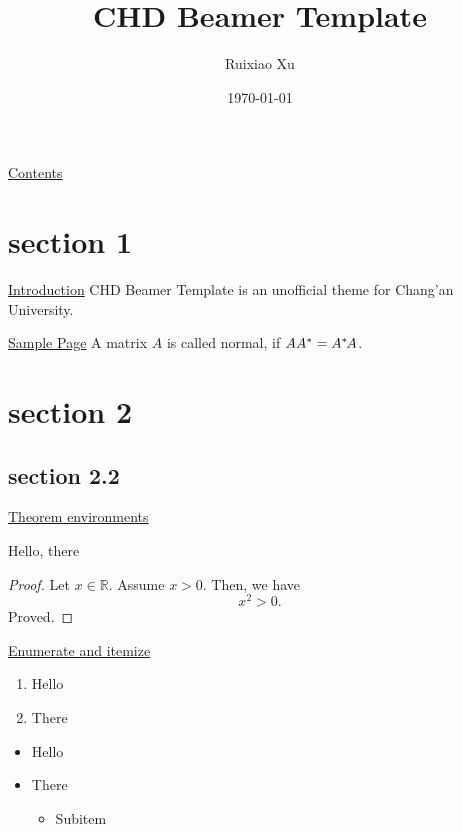 \documentclass[11pt,aspectratio=43,xcolor={dvipsnames},hyperref={pdftex,pdfpagemode=UseNone,hidelinks,pdfdisplaydoctitle=true},usepdftitle=false]{ctexbeamer}
\title{CHD Beamer Template}
\author{Ruixiao Xu}
\institute{School of Information Engineering\\Chang'an University}
\date{\today}
\begin{document}
\begin{frame}
  \maketitle
\end{frame}

\begin{frame}{\underline{Contents}}
  \tableofcontents
\end{frame}

\section{section 1}
\begin{frame}{\underline{Introduction}}
  \alert{CHD Beamer Template} is an unofficial theme for Chang'an University.
\end{frame}

\begin{frame}{\underline{Sample Page}}
  A matrix $A$ is called normal, if $AA^*=A^*\mskip-2muA$.
\end{frame}

\section{section 2}
\subsection{section 2.2}
\begin{frame}{\underline{Theorem environments}}
  \begin{theorem}
    Hello, there
  \end{theorem}
  \begin{proof}
    Let $x \in \mathbb{R}$. Assume $x > 0$. Then, we have
    \begin{equation}
      x^2 > 0.
    \end{equation}
    Proved.
  \end{proof}
\end{frame}

\begin{frame}{\underline{Enumerate and itemize}}
  \begin{enumerate}
    \item Hello
    \item There
  \end{enumerate}
  \begin{itemize}
    \item Hello
    \item There
          \begin{itemize}
            \item Subitem
          \end{itemize}
  \end{itemize}
\end{frame}
\end{document}
